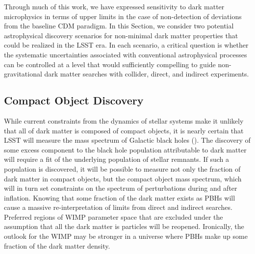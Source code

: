 \documentclass[modern,linenumbers]{aastex62}
\begin{document}
Through much of this work, we have expressed sensitivity to dark matter microphysics in terms of upper limits in the case of non-detection of deviations from the baseline CDM paradigm.
In this Section, we consider two potential astrophysical discovery scenarios for non-minimal dark matter properties that could be realized in the LSST era.
In each scenario, a critical question is whether the systematic uncertainties associated with conventional astrophysical processes can be controlled at a level that would sufficiently compelling to guide non-gravitational dark matter searches with collider, direct, and indirect experiments.

\subsection{Compact Object Discovery}

While current constraints from the dynamics of stellar systems make it unlikely that all of dark matter is composed of compact objects, it is nearly certain that LSST will measure the mass spectrum of Galactic black holes ().
The discovery of some excess component to the black hole population attributable to dark matter will require a fit of the underlying population of stellar remnants.
If such a population is discovered, it will be possible to measure not only the fraction of dark matter in compact objects, but the compact object mass spectrum, which will in turn set constraints on the spectrum of perturbations during and after inflation.
Knowing that some fraction of the dark matter exists as PBHs will cause a massive re-interpretation of limits from direct and indirect searches.
Preferred regions of WIMP parameter space that are excluded under the assumption that all the dark matter is particles will be reopened.
Ironically, the outlook for the WIMP may be stronger in a universe where PBHs make up some fraction of the dark matter density.
\end{document}
